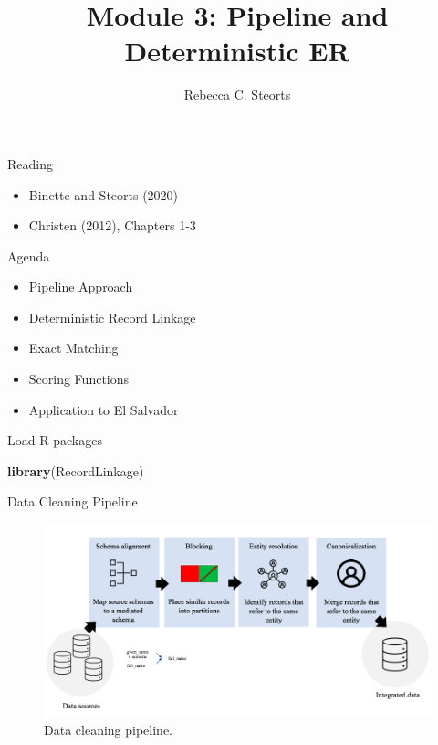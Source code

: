 \documentclass[
  ignorenonframetext,
]{beamer}
\title{Module 3: Pipeline and Deterministic ER}
\author{Rebecca C. Steorts}
\date{}
\newenvironment{Shaded}{\begin{snugshade}}{\end{snugshade}}
\newcommand{\KeywordTok}[1]{\textcolor[rgb]{0.13,0.29,0.53}{\textbf{#1}}}
\newcommand{\NormalTok}[1]{#1}
\providecommand{\tightlist}{%
  \setlength{\itemsep}{0pt}\setlength{\parskip}{0pt}}
\begin{document}
\frame{\titlepage}

\begin{frame}{Reading}
\protect\hypertarget{reading}{}

\begin{itemize}
\tightlist
\item
  Binette and Steorts (2020)
\item
  Christen (2012), Chapters 1-3
\end{itemize}

\end{frame}

\begin{frame}{Agenda}
\protect\hypertarget{agenda}{}

\begin{itemize}
\tightlist
\item
  Pipeline Approach
\item
  Deterministic Record Linkage
\item
  Exact Matching
\item
  Scoring Functions
\item
  Application to El Salvador
\end{itemize}

\end{frame}

\begin{frame}[fragile]{Load R packages}
\protect\hypertarget{load-r-packages}{}

\begin{Shaded}
\begin{Highlighting}[]
\KeywordTok{library}\NormalTok{(RecordLinkage)}
\end{Highlighting}
\end{Shaded}

\end{frame}

\begin{frame}{Data Cleaning Pipeline}
\protect\hypertarget{data-cleaning-pipeline}{}

\begin{figure}
  \begin{center}
    \includegraphics[width=\textwidth]{finalFigures/pipeline}
    \caption{Data cleaning pipeline.}
    \end{center}
\end{figure}

\end{frame}
\end{document}
